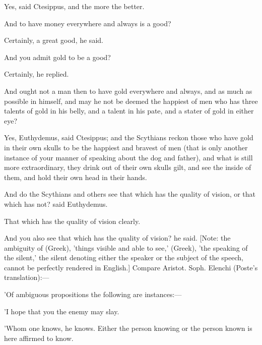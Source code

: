 \documentclass[11pt,letter]{article}
\begin{document}
\par  Yes, said Ctesippus, and the more the better.

\par  And to have money everywhere and always is a good?

\par  Certainly, a great good, he said.

\par  And you admit gold to be a good?

\par  Certainly, he replied.

\par  And ought not a man then to have gold everywhere and always, and as much as possible in himself, and may he not be deemed the happiest of men who has three talents of gold in his belly, and a talent in his pate, and a stater of gold in either eye?

\par  Yes, Euthydemus, said Ctesippus; and the Scythians reckon those who have gold in their own skulls to be the happiest and bravest of men (that is only another instance of your manner of speaking about the dog and father), and what is still more extraordinary, they drink out of their own skulls gilt, and see the inside of them, and hold their own head in their hands.

\par  And do the Scythians and others see that which has the quality of vision, or that which has not? said Euthydemus.

\par  That which has the quality of vision clearly.

\par  And you also see that which has the quality of vision? he said. [Note: the ambiguity of (Greek), 'things visible and able to see,' (Greek), 'the speaking of the silent,' the silent denoting either the speaker or the subject of the speech, cannot be perfectly rendered in English.] Compare Aristot. Soph. Elenchi (Poste's translation):—

\par  'Of ambiguous propositions the following are instances:—

\par  'I hope that you the enemy may slay.

\par  'Whom one knows, he knows. Either the person knowing or the person known is here affirmed to know.
\end{document}
